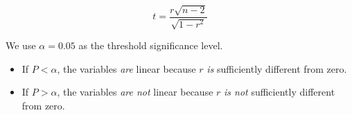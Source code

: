 \documentclass[12pt]{article}
\begin{document}
\begin{equation}\label{eq2}
	t = \frac{r \sqrt{n-2}}{\sqrt{1 - r^2}}
\end{equation}

We use $\alpha = 0.05$ as the threshold significance level.
\begin{itemize}
	\item If $P < \alpha$, the variables \textit{are}
	linear because $r$ \textit{is} sufficiently different from zero.
	\item If $P > \alpha$, the variables \textit{are not}
	linear because $r$ \textit{is not} sufficiently different from zero.
\end{itemize}
\end{document}
